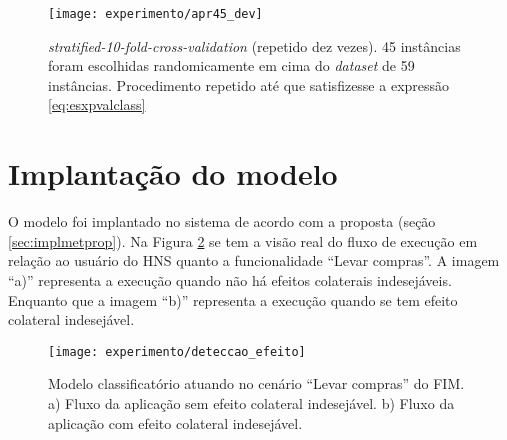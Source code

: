 \begin{figure}[!htb] \centering 
  \centering
  \texttt{[image: experimento/apr45\_dev]} 
  \caption{\textit{stratified-10-fold-cross-validation} (repetido dez vezes). 45 instâncias foram escolhidas randomicamente em cima do \textit{dataset} de 59 instâncias. Procedimento repetido até que satisfizesse a expressão \ref{eq:esxpvalclass} } 
  \label{fig:apr45_dev}
\end{figure}

\section{Implantação do modelo}
O modelo foi implantado no sistema de acordo com a proposta (seção \ref{sec:implmetprop}). Na Figura \ref{fig:deteccao_efeito} se tem a visão real do fluxo de execução em relação ao usuário do HNS quanto a funcionalidade ``Levar compras''. A imagem ``a)'' representa a execução quando não há efeitos colaterais indesejáveis. Enquanto que a imagem ``b)'' representa a execução quando se tem efeito colateral indesejável. 
\begin{figure}[!htb] \centering 
  \centering
  \texttt{[image: experimento/deteccao\_efeito]} 
  \caption{Modelo classificatório atuando no cenário ``Levar compras'' do FIM. a) Fluxo da aplicação sem efeito colateral indesejável. b) Fluxo da aplicação com efeito colateral indesejável.} 
  \label{fig:deteccao_efeito}
\end{figure}
